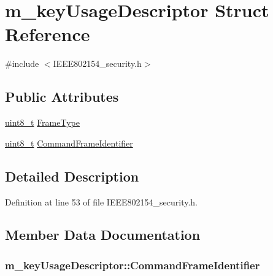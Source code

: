 \hypertarget{structm__key_usage_descriptor}{}\section{m\+\_\+key\+Usage\+Descriptor Struct Reference}
\label{structm__key_usage_descriptor}


{\ttfamily \#include $<$I\+E\+E\+E802154\+\_\+security.\+h$>$}

\subsection*{Public Attributes}
\begin{DoxyCompactItemize}
\item 
\hyperlink{_p_e___types_8h_aba7bc1797add20fe3efdf37ced1182c5}{uint8\+\_\+t} \hyperlink{structm__key_usage_descriptor_ac94f434b99c2a151cfa0e26bf3148213}{Frame\+Type}
\item 
\hyperlink{_p_e___types_8h_aba7bc1797add20fe3efdf37ced1182c5}{uint8\+\_\+t} \hyperlink{structm__key_usage_descriptor_a3892faa2fdc895a1b42f6efc5d0faeb4}{Command\+Frame\+Identifier}
\end{DoxyCompactItemize}


\subsection{Detailed Description}


Definition at line 53 of file I\+E\+E\+E802154\+\_\+security.\+h.



\subsection{Member Data Documentation}
\subsubsection[{\texorpdfstring{Command\+Frame\+Identifier}{CommandFrameIdentifier}}]{ m\+\_\+key\+Usage\+Descriptor\+::\+Command\+Frame\+Identifier}\hypertarget{structm__key_usage_descriptor_a3892faa2fdc895a1b42f6efc5d0faeb4}{}\label{structm__key_usage_descriptor_a3892faa2fdc895a1b42f6efc5d0faeb4}


